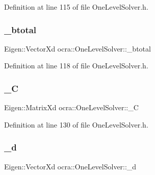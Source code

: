 Definition at line 115 of file One\+Level\+Solver.\+h.

\hypertarget{classocra_1_1OneLevelSolver_a6ac65183fc93ea82d7e72fd4aae1422b}{}\label{classocra_1_1OneLevelSolver_a6ac65183fc93ea82d7e72fd4aae1422b} 
\subsubsection{\texorpdfstring{\+\_\+btotal}{\_btotal}}
{\footnotesize\ttfamily Eigen\+::\+Vector\+Xd ocra\+::\+One\+Level\+Solver\+::\+\_\+btotal\hspace{0.3cm}{\ttfamily [protected]}}



Definition at line 118 of file One\+Level\+Solver.\+h.

\hypertarget{classocra_1_1OneLevelSolver_aad5ebd6a765da03c843c6d63539e6450}{}\label{classocra_1_1OneLevelSolver_aad5ebd6a765da03c843c6d63539e6450} 
\subsubsection{\texorpdfstring{\+\_\+C}{\_C}}
{\footnotesize\ttfamily Eigen\+::\+Matrix\+Xd ocra\+::\+One\+Level\+Solver\+::\+\_\+C\hspace{0.3cm}{\ttfamily [protected]}}



Definition at line 130 of file One\+Level\+Solver.\+h.

\hypertarget{classocra_1_1OneLevelSolver_a5fe79bb9685753a4db27e99f6b780832}{}\label{classocra_1_1OneLevelSolver_a5fe79bb9685753a4db27e99f6b780832} 
\subsubsection{\texorpdfstring{\+\_\+d}{\_d}}
{\footnotesize\ttfamily Eigen\+::\+Vector\+Xd ocra\+::\+One\+Level\+Solver\+::\+\_\+d\hspace{0.3cm}{\ttfamily [protected]}}



